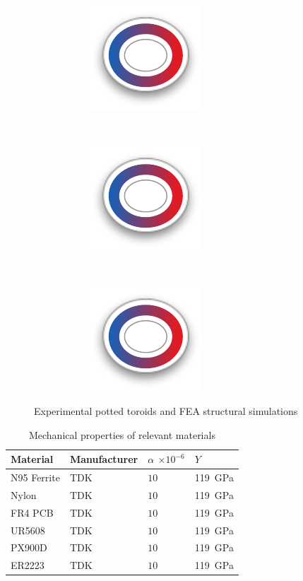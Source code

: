 \documentclass[conference]{IEEEtran}
\begin{document}
\begin{figure}
\begin{subfigure}{\textwidth}
    \begin{subfigure}{0.3\textwidth}
      \centering
      \includegraphics{figures/featoroid.pdf}
      \caption{}
    \end{subfigure}~
    \begin{subfigure}{0.3\textwidth}
      \centering
      \includegraphics{figures/featoroid.pdf}
      \caption{}
    \end{subfigure}~
    \begin{subfigure}{0.3\textwidth}
      \centering
      \includegraphics{figures/featoroid.pdf}
      \caption{}
    \end{subfigure}
  \end{subfigure}
  \caption{Experimental potted toroids and FEA structural simulations}
  \label{fig:pottedtoroids}
\end{figure}

\begin{table}
  \centering
  \caption{Mechanical properties of relevant materials}
  \begin{tabular}{@{}llll@{}}
    \toprule
    Material & Manufacturer & $\alpha$ $\times 10^{-6}$ & $Y$ \\ \midrule
    N95 Ferrite & TDK & $10$ & \SI{119}{\giga\pascal} \\
    Nylon & TDK & $10$ & \SI{119}{\giga\pascal} \\
    FR4 PCB & TDK & $10$ & \SI{119}{\giga\pascal} \\
    UR5608 & TDK & $10$ & \SI{119}{\giga\pascal} \\
    PX900D & TDK & $10$ & \SI{119}{\giga\pascal} \\
    ER2223 & TDK & $10$ & \SI{119}{\giga\pascal} \\
    \bottomrule
  \end{tabular}
\end{table}
\end{document}

